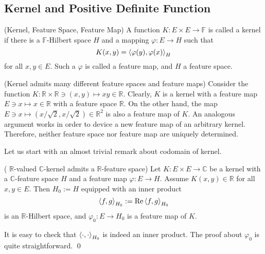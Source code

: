 \documentclass[a4paper,12pt]{article}
\begin{document}
\subsection{Kernel and Positive Definite Function}
\begin{dfn} (Kernel, Feature Space, Feature Map)
	A function \( K:E \times E \to \mathbb{F} \) is called a kernel if there is a \( \mathbb{F}\)-Hilbert space \( H \) and a mapping \( \varphi:E \to H \) such that
	\begin{equation*}
		K(x,y) = \left<\varphi(y), \varphi(x) \right>_H
	\end{equation*}
	for all \( x,y \in E \).
	Such a \( \varphi \) is called a feature map, and \( H \) a feature space.
\end{dfn}

\begin{ex}(Kernel admits many different feature spaces and feature maps)
	Consider the function \( K:\mathbb{R} \times \mathbb{R} \ni (x,y) \mapsto xy \in \mathbb{R} \). Clearly, \( K \) is a kernel with a feature map \( E \ni x \mapsto x \in \mathbb{R} \) with a feature space \( \mathbb{R} \). On the other hand, the map \( E \ni x \mapsto (x / \sqrt{2}, x / \sqrt{2}) \in \mathbb{R}^2 \) is also a feature map of \( K \). An analogous argument works in order to device a new feature map of an arbitrary kernel. Therefore, neither feature space nor feature map are uniquely determined.
	\fin\end{ex}

Let us start with an almost trivial remark about codomain of kernel.
\begin{prp} ( \( \mathbb{R} \)-valued \( \mathbb{C} \)-kernel admits a \( \mathbb{R} \)-feature space)\label{R-valued C-kernel admits a R-feature space}
	Let \( K:E \times E \to \mathbb{C} \) be a kernel with a \( \mathbb{C} \)-feature space \( H \) and a feature map \( \varphi:E \to H \). Assume \( K(x,y)\in \mathbb{R} \) for all \( x,y \in E \). Then \( H_0 := H \) equipped with an inner product
	\begin{equation*}
		\left<f, g \right>_{H_0} := \operatorname{Re} \left<f, g \right>_{H_0}
	\end{equation*}
	is an \( \mathbb{R} \)-Hilbert space, and \( \varphi_0:E \to H_0 \) is a feature map of \( K \).
\end{prp}
\begin{prf}
	It is easy to check that \( \left<\cdot , \cdot  \right>_{H_0} \) is indeed an inner product. The proof about \( \varphi_0 \) is quite straightforward.
	\qed\end{prf}
\end{document}
